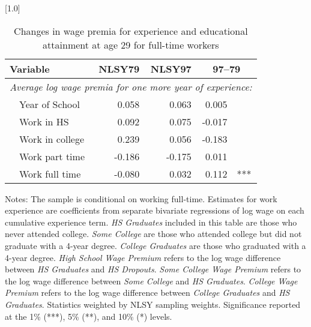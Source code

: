\begin{table}[ht]
\caption{Changes in wage premia for experience and educational attainment at age 29 for full-time workers}
\label{tab:wagepremiaDiscrete}
\centering
\scalebox{1.0}[1.0]{%
\begin{threeparttable}
\begin{tabular}{lrrr@{}l}
\toprule 
Variable & NLSY79 & NLSY97 & \multicolumn{2}{c}{97--79} \\
\midrule 
\multicolumn{5}{l}{\emph{Average log wage premia for one more year of experience:}} \\
~~Year of School    & 0.058 & 0.063 & 0.005 &    \\ 
~~Work in HS        & 0.092 & 0.075 & -0.017 &    \\ 
~~Work in college   & 0.239 & 0.056 & -0.183 &    \\ 
~~Work part time    & -0.186 & -0.175 & 0.011 &    \\ 
~~Work full time    & -0.080 & 0.032 & 0.112 &  *** \\ 
\end{tabular} 
\footnotesize{Notes: The sample is conditional on working full-time. Estimates for work experience are coefficients from separate bivariate regressions of log wage on each cumulative experience term. \emph{HS Graduates} included in this table are those who never attended college. \emph{Some College} are those who attended college but did not graduate with a 4-year degree. \emph{College Graduates} are those who graduated with a 4-year degree. \emph{High School Wage Premium} refers to the log wage difference between \emph{HS Graduates} and \emph{HS Dropouts}. \emph{Some College Wage Premium} refers to the log wage difference between \emph{Some College} and \emph{HS Graduates}. \emph{College Wage Premium} refers to the log wage difference between \emph{College Graduates} and \emph{HS Graduates}. Statistics weighted by NLSY sampling weights. Significance reported at the 1\% (***), 5\% (**), and 10\% (*) levels.}
\end{threeparttable} 
} 
\end{table} 
